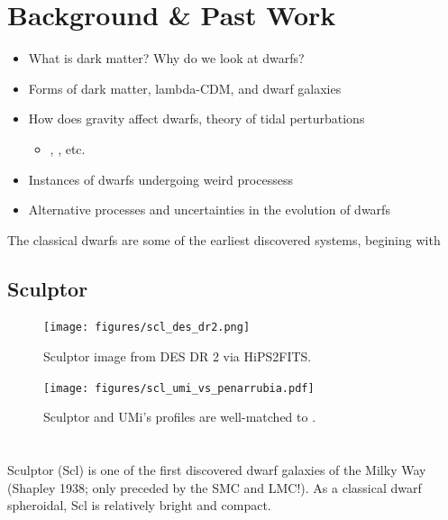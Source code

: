 \section{Background \& Past Work}\label{background-past-work}

\begin{itemize}
\tightlist
\item
  What is dark matter? Why do we look at dwarfs?
\item
  Forms of dark matter, lambda-CDM, and dwarf galaxies
\item
  How does gravity affect dwarfs, theory of tidal perturbations

  \begin{itemize}
  \tightlist
  \item
    \citet{EN2021}, \citet{PNM2008}, etc.
  \end{itemize}
\item
  Instances of dwarfs undergoing weird processess
\item
  Alternative processes and uncertainties in the evolution of dwarfs
\end{itemize}

The classical dwarfs are some of the earliest discovered systems,
begining with \citet{shapley1938}

\subsection{Sculptor}\label{sculptor}

\begin{figure}
\centering
\texttt{[image: figures/scl\_des\_dr2.png]}
\caption[scl\_image]{Sculptor image from DES DR 2 via
HiPS2FITS.}\label{fig:scl_image}
\end{figure}

\begin{figure}
\centering
\texttt{[image: figures/scl\_umi\_vs\_penarrubia.pdf]}
\caption[Idealized simulations match Scl and UMi]{Sculptor and UMi's
profiles are well-matched to \citet{PNM2008}.}\label{fig:toy_profiles}
\end{figure}

\section{}\label{section}

Sculptor (Scl) is one of the first discovered dwarf galaxies of the
Milky Way (Shapley 1938; only preceded by the SMC and LMC!). As a
classical dwarf spheroidal, Scl is relatively bright and compact.

